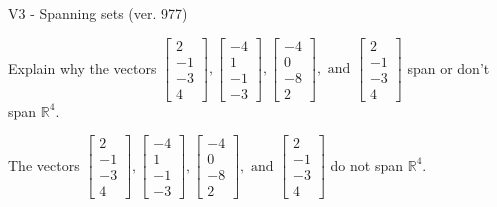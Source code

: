 \begin{exercise}
  \begin{exerciseTitle}V3 - Spanning sets (ver. 977)\end{exerciseTitle}
  \begin{exerciseStatement}
    Explain why the vectors \(\left[\begin{array}{r}
2 \\
-1 \\
-3 \\
4
\end{array}\right] , \left[\begin{array}{r}
-4 \\
1 \\
-1 \\
-3
\end{array}\right] , \left[\begin{array}{r}
-4 \\
0 \\
-8 \\
2
\end{array}\right] , \text{ and } \left[\begin{array}{r}
2 \\
-1 \\
-3 \\
4
\end{array}\right]\) span or don't span \(\mathbb{R}^4\). 
	


  \end{exerciseStatement}
  \begin{exerciseAnswer}
   The vectors \(\left[\begin{array}{r}
2 \\
-1 \\
-3 \\
4
\end{array}\right] , \left[\begin{array}{r}
-4 \\
1 \\
-1 \\
-3
\end{array}\right] , \left[\begin{array}{r}
-4 \\
0 \\
-8 \\
2
\end{array}\right] , \text{ and } \left[\begin{array}{r}
2 \\
-1 \\
-3 \\
4
\end{array}\right]\) 
  	 do not  
	span \(\mathbb{R}^4\).
  


  \end{exerciseAnswer}
\end{exercise}